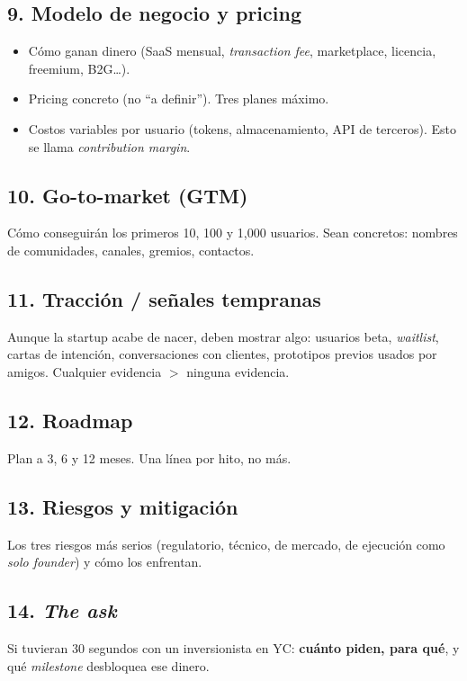 \documentclass[11pt,a4paper]{article}
\begin{document}
\subsection{9. Modelo de negocio y pricing}
\begin{itemize}[leftmargin=1.2em,itemsep=2pt,topsep=2pt]
  \item C\'omo ganan dinero (SaaS mensual, \emph{transaction fee}, marketplace,
        licencia, freemium, B2G\ldots).
  \item Pricing concreto (no ``a definir''). Tres planes m\'aximo.
  \item Costos variables por usuario (tokens, almacenamiento, API de terceros).
        Esto se llama \emph{contribution margin}.
\end{itemize}

\subsection{10. Go-to-market (GTM)}
C\'omo conseguir\'an los primeros 10, 100 y 1{,}000 usuarios.
Sean concretos: nombres de comunidades, canales, gremios, contactos.

\subsection{11. Tracci\'on / se\~nales tempranas}
Aunque la startup acabe de nacer, deben mostrar algo:
usuarios beta, \emph{waitlist}, cartas de intenci\'on, conversaciones con clientes,
prototipos previos usados por amigos. Cualquier evidencia $>$ ninguna evidencia.

\subsection{12. Roadmap}
Plan a 3, 6 y 12 meses. Una l\'inea por hito, no m\'as.

\subsection{13. Riesgos y mitigaci\'on}
Los tres riesgos m\'as serios (regulatorio, t\'ecnico, de mercado, de ejecuci\'on como \emph{solo founder}) y c\'omo los enfrentan.

\subsection{14. \emph{The ask}}
Si tuvieran 30 segundos con un inversionista en YC: \textbf{cu\'anto piden,
para qu\'e}, y qu\'e \emph{milestone} desbloquea ese dinero.
\end{document}
